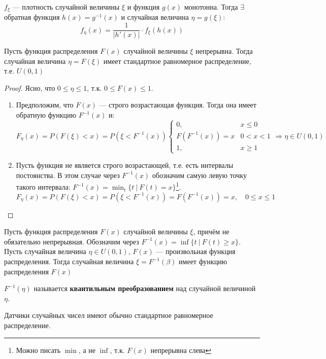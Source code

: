 \begin{theorem}
    \(f_\xi\) --- плотность случайной величины \(\xi\) и функция \(g(x)\) монотонна. Тогда \(\exists \) обратная функция \(h(x) = g^{ - 1}(x)\) и случайная величина \(\eta = g(\xi)\):
    \[f_\eta(x) = \frac{1}{|h'(x)|} \cdot f_\xi(h(x))\]
\end{theorem}

\begin{theorem}
    Пусть функция распределения \(F(x)\) случайной величины \(\xi\) непрерывна. Тогда случайная величина \(\eta = F(\xi)\) имеет стандартное равномерное распределение, т.е. \(U(0, 1)\)
\end{theorem}
\begin{proof}
    Ясно, что \(0 \leq \eta \leq 1\), т.к. \(0 \leq F(x) \leq 1\).
    \begin{enumerate}
        \item Предположим, что \(F(x)\) --- строго возрастающая функция. Тогда она имеет обратную функцию \(F^{ - 1}(x)\) и:
              \[F_\eta(x) = P(F(\xi) < x) = P(\xi < F^{ - 1}(x)) \begin{cases}
                      0,                 & x \leq 0  \\
                      F(F^{ - 1}(x)) = x & 0 < x < 1 \\
                      1,                 & x \geq 1
                  \end{cases} \Rightarrow \eta \in U(0, 1)\]
        \item Пусть функция не является строго возрастающей, т.е. есть интервалы постоянства. В этом случае через \(F^{ - 1}(x)\) обозначим самую левую точку такого интервала: \(F^{ - 1}(x) = \min_t \{t\ |\ F(t) = x\}\)\footnote{Можно писать \(\min\), а не \(\inf\), т.к. \(F(x)\) непрерывна слева}.
              \[F_\eta(x) = P(F(\xi) < x) = P(\xi < F^{ - 1}(x)) = F(F^{ - 1}(x)) = x, \quad 0 \leq x \leq 1\]
    \end{enumerate}
\end{proof}

\begin{theorem}[обратная]
    \label{обратная}
    Пусть функция распределения \(F(x)\) случайной величины \(\xi\), причём не обязательно непрерывная. Обозначим через \(F^{- 1}(x) = \inf \{t\ |\ F(t) \geq x\} \). Пусть случайная величина \(\eta \in U(0, 1)\), \(F(x)\) --- произвольная функция распределения. Тогда случайная величина \(\xi = F^{ - 1}(\beta)\) имеет функцию распределения \(F(x)\)
\end{theorem}
\begin{remark}
    \(F^{ - 1}(\eta)\) называется \textbf{квантильным преобразованием} над случайной величиной \(\eta\).
\end{remark}
\begin{remark}
    Датчики случайных чисел имеют обычно стандартное равномерное распределение.
\end{remark}

